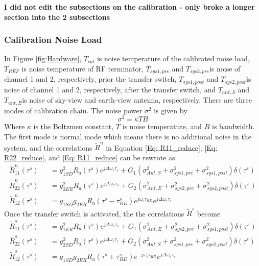 \documentclass[draftcls,onecolumn]{IEEEtran}  %
\begin{document}
\bf I did not edit the subsections on the calibration - only broke a longer section into the 2 subsections \rm

\subsubsection{Calibration Noise Load}
In Figure \ref{fig:Hardware}, $T_{cal}$ is noise temperature of the calibrated noise load, $T_{REF}$ is noise temperature of RF terminator, $T_{sys1,pre}$ and $T_{sys2,pre}$is noise of channel 1 and 2, respectively, prior the transfer switch, $T_{sys1,post}$ and $T_{sys2,post}$is noise of channel 1 and 2, respectively, after the transfer switch, and $T_{ant,S}$ and $T_{ant,E}$is noise of sky-view and earth-view antenna, respectively. There are three modes of calibration chain. The noise power $\sigma^2$ is given by
\begin{equation}
	\sigma^2=\kappa TB
\end{equation}
Where $\kappa$ is the Boltzmen constant, $T$ is noise temperature, and $B$ is bandwidth. The first mode is normal mode which means there is no additional noise in the system, and the correlations $\tilde{R}^n$ in Equation \ref{Eq: R11_reduce}, \ref{Eq: R22_reduce}, and \ref{Eq: R11_reduce} can be rewrote as
\begin{eqnarray}
	\tilde{R}_{11}^n(\tau^s) &&= g^2_{1SD} R_a(\tau^s)e^{j\Delta\omega_e\tau_s}+
G_1(\sigma^2_{Ant,S}+\sigma^2_{sys1,pre} +\sigma^2_{sys1,post}) \delta(\tau^s)                                      
\label{Eq: R11_reduce_norm} \\
	\tilde{R}_{22}^n(\tau^s) &&= g^2_{2ER} R_a(\tau^s)e^{j\Delta\omega_e\tau_s}+
G_2(\sigma^2_{Ant,E}+\sigma^2_{sys2,pre} +\sigma^2_{sys2,post}) \delta(\tau^s)                                       
\label{Eq: R22_reduce_norm} \\
	\tilde{R}_{12}^n(\tau^s) &&= g_{1SD} g_{2ER} R_a(\tau^s-\tau^s_{RD})e^{j\omega_e \tau_{RD}} e^{j\Delta\omega_e\tau_s}  
\label{Eq: R12_reduce_norm}
\end{eqnarray}
Once the transfer switch is activated, the the correlations $\tilde{R}^s$ become
\begin{eqnarray}
\tilde{R}_{11}^s(\tau^s) &&= g^2_{1ER} R_a(\tau^s)e^{j\Delta\omega_e\tau_s}+
G_1(\sigma^2_{Ant,E}+\sigma^2_{sys2,pre} +\sigma^2_{sys1,post}) \delta(\tau^s)                                       
\label{Eq: R22_reduce_swap} \\
\tilde{R}_{22}^s(\tau^s) &&= g^2_{2SD} R_a(\tau^s)e^{j\Delta\omega_e\tau_s}+
G_2(\sigma^2_{Ant,S}+\sigma^2_{sys1,pre} +\sigma^2_{sys2,post}) \delta(\tau^s)                                      
\label{Eq: R11_reduce_swap} \\
	\tilde{R}_{12}^s(\tau^s) &&= g_{1SD} g_{2ER} R_a(\tau^s+\tau^s_{RD})e^{-j\omega_e \tau_{RD}} e^{j\Delta\omega_e\tau_s}  
\label{Eq: R12_reduce_swap}
\end{eqnarray}
\end{document}
